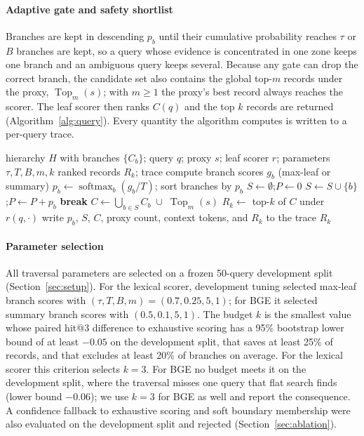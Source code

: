 \documentclass{ieeeaccess}
\begin{document}
\paragraph{Adaptive gate and safety shortlist}
Branches are kept in descending $p_b$ until their cumulative probability reaches
$\tau$ or $B$ branches are kept, so a query whose evidence is concentrated in one
zone keeps one branch and an ambiguous query keeps several. Because any gate can
drop the correct branch, the candidate set also contains the global top-$m$
records under the proxy, $\operatorname{Top}_m(s)$; with $m\geq1$ the proxy's
best record always reaches the scorer. The leaf scorer then ranks $C(q)$ and the
top $k$ records are returned (Algorithm~\ref{alg:query}). Every quantity the
algorithm computes is written to a per-query trace.

\begin{algorithm}[!t]
\caption{Recall-controlled query traversal}
\label{alg:query}
\small
\begin{algorithmic}[1]
\Require hierarchy $H$ with branches $\{C_b\}$; query $q$; proxy $s$; leaf
scorer $r$; parameters $\tau, T, B, m, k$
\Ensure ranked records $R_k$; trace
\State compute branch scores $g_b$ (max-leaf or summary)
\State $p_b\gets\operatorname{softmax}_b(g_b/T)$; sort branches by $p_b$
\State $S\gets\emptyset$;\quad $P\gets 0$
 \State $S\gets S\cup\{b\}$;\quad $P\gets P+p_b$
  \textbf{break} \EndIf
\EndFor
\State $C\gets\bigcup_{b\in S}C_b\;\cup\;\operatorname{Top}_m(s)$
\State $R_k\gets$ top-$k$ of $C$ under $r(q,\cdot)$
\State write $p_b$, $S$, $C$, proxy count, context tokens, and $R_k$ to the trace
\State \Return $R_k$
\end{algorithmic}
\end{algorithm}

\paragraph{Parameter selection}
All traversal parameters are selected on a frozen 50-query development split
(Section~\ref{sec:setup}). For the lexical scorer, development tuning selected
max-leaf branch scores with $(\tau,T,B,m)=(0.7,0.25,5,1)$; for BGE it selected
summary branch scores with $(0.5,0.1,5,1)$. The budget $k$ is the smallest value
whose paired hit@3 difference to exhaustive scoring has a 95\% bootstrap lower
bound of at least $-0.05$ on the development split, that saves at least 25\% of
records, and that excludes at least 20\% of branches on average. For the lexical
scorer this criterion selects $k=3$. For BGE no budget meets it on the
development split, where the traversal misses one query that flat search finds
(lower bound $-0.06$); we use $k=3$ for BGE as well and report the consequence.
A confidence fallback to exhaustive scoring and soft boundary membership were
also evaluated on the development split and rejected (Section~\ref{sec:ablation}).
\end{document}
